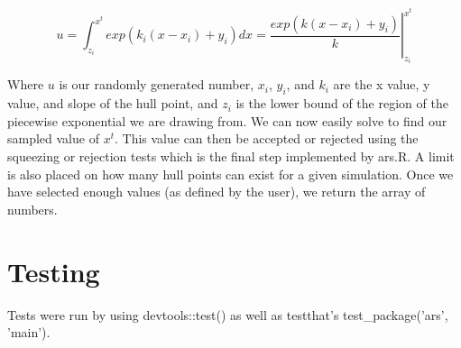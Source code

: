 \documentclass[12pt, oneside]{article}
\begin{document}
\[ u = \int_{z_i}^{x^t} exp(k_i (x - x_i) + y_i) dx = \left. \frac{exp(k (x - x_i )+ y_i)}{k} \right|_{z_i}^{x^t} \] 

Where \(u\) is our randomly generated number, \(x_i\), \(y_i\), and \(k_i\) are the x value, y value, and slope of the hull point, and \(z_i\) is the lower bound of the region of the piecewise exponential we are drawing from.  We can now easily solve to find our sampled value of \(x^t\).  This value can then be accepted or rejected using the squeezing or rejection tests which is the final step implemented by ars.R.    A limit is also placed on how many hull points can exist for a given simulation.  Once we have selected enough values (as defined by the user), we return the array of numbers.

\section{Testing}

Tests were run by using devtools::test() as well as testthat's test\_package('ars', 'main').
\end{document}
